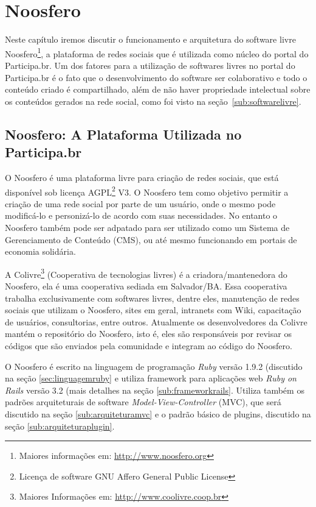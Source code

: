 \chapter{Noosfero}
\label{cap:noosfero}
Neste capítulo iremos discutir o funcionamento e arquitetura do software livre Noosfero\footnote{Maiores informações em: \url{http://www.noosfero.org}}, a plataforma de redes sociais que é utilizada como núcleo do portal do Participa.br. Um dos fatores para a utilização de softwares livres no portal do Participa.br é o fato que o desenvolvimento do software ser colaborativo e todo o conteúdo criado é compartilhado, além de não haver propriedade intelectual sobre os conteúdos gerados na rede social, como foi visto na seção~\ref{sub:softwarelivre}.


\section{Noosfero: A Plataforma Utilizada no Participa.br}
O Noosfero é uma plataforma livre para criação de redes sociais, que está disponível sob licença AGPL\footnote{Licença de software GNU Affero General Public License} V3. O Noosfero tem como objetivo permitir a criação de uma rede social por parte de um usuário, onde o mesmo pode modificá-lo e personizá-lo de acordo com suas necessidades. No entanto o Noosfero também pode ser adpatado para ser utilizado como um Sistema de Gerenciamento de Conteúdo (CMS), ou até mesmo funcionando em portais de economia solidária.

A Colivre\footnote{Maiores Informações em: \url{http://www.coolivre.coop.br}} (Cooperativa de tecnologias livres) é a criadora/mantenedora do Noosfero, ela é uma cooperativa sediada em Salvador/BA. Essa cooperativa trabalha exclusivamente com softwares livres, dentre eles, manutenção de redes sociais que utilizam o Noosfero, sites em geral, intranets com Wiki, capacitação de usuários, consultorias, entre outros. Atualmente os desenvolvedores da Colivre mantém o repositório do Noosfero, isto é, eles são responsáveis por revisar os códigos que são enviados pela comunidade e integram ao código do Noosfero.

O Noosfero é escrito na linguagem de programação \textit{Ruby} versão 1.9.2 (discutido na seção \ref{sec:linguagemruby} e utiliza framework para aplicações web \textit{Ruby on Rails} versão 3.2 (mais detalhes na seção \ref{sub:frameworkrails}. Utiliza também os padrões arquiteturais de software \textit{Model-View-Controller} (MVC), que será discutido na seção \ref{sub:arquiteturamvc} e o padrão básico de plugins, discutido na seção \ref{sub:arquiteturaplugin}. 

